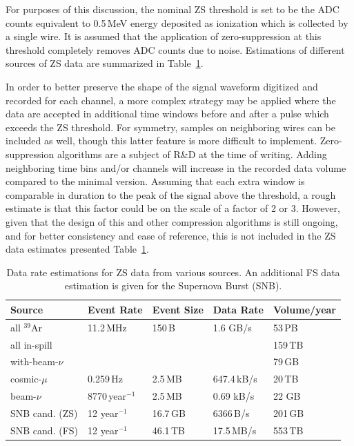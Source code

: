 For purposes of this discussion, the nominal ZS threshold is set to be the ADC counts equivalent to 0.5\,MeV energy deposited
as ionization which is collected by a single wire. It is assumed that the application of zero-suppression at this
threshold completely removes ADC counts due to noise. %
Estimations of different sources of ZS data are summarized in Table~\ref{tab:zs-volume}.

In order to better preserve the shape of the signal waveform digitized and recorded for
each channel, a more complex strategy may be applied where the data are accepted in additional
time windows before and after a pulse which exceeds the ZS threshold.  For symmetry, samples on neighboring
wires can be included as well, though this latter feature is more difficult to implement.
Zero-suppression algorithms are a subject of R\&D at the time of writing.   Adding neighboring time bins
and/or channels will increase in the recorded data volume compared to the minimal version. Assuming that
each extra window is comparable in duration to the peak of the signal above the threshold,
a rough estimate is that this factor could be on the scale of a factor of 2 or 3. However, given
that the design of this and other compression algorithms is still ongoing, and for better consistency
and ease of reference, this is not included in the ZS data estimates presented Table~\ref{tab:zs-volume}.
	
\begin{table}[ht!]
\centering
\begin{tabular}{| p{1.2in} | p{0.9in} | p{0.75in} | p{0.8in} | p{0.9in} |}		\hline		
Source & Event Rate & Event Size & Data Rate & Volume/year \\ \hline
all $^{39}$Ar & 11.2\,MHz & 150\,B & 1.6 GB/s &  53\,PB \\ \hline
all in-spill & & & & 159\,TB \\ \hline
with-beam-$\nu$ & & & & 79\,GB \\ \hline \hline
cosmic-$\mu$ & 0.259\,Hz &2.5\,MB & 647.4\,kB/s & 20\,TB \\	\hline
beam-$\nu$ & 8770\,year$^{-1}$ & 2.5\,MB & 0.69 kB/s & 22 GB \\ \hline \hline
SNB cand. (ZS) & 12 year$^{-1}$ & 16.7\,GB & 6366\,B/s & 201\,GB \\ \hline
SNB cand. (FS) & 12 year$^{-1}$ & 46.1\,TB & 17.5\,MB/s & 553\,TB \\ \hline
\end{tabular}
\caption{Data rate estimations for ZS data from various sources.
An additional FS data estimation is given for the Supernova Burst (SNB).}
\label{tab:zs-volume}
\end{table}

